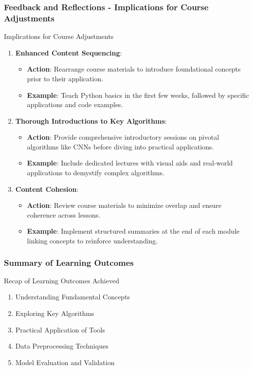 \documentclass[aspectratio=169]{beamer}
\begin{document}
\begin{frame}[fragile]
    \frametitle{Feedback and Reflections - Implications for Course Adjustments}
    \begin{block}{Implications for Course Adjustments}
        \begin{enumerate}
            \item \textbf{Enhanced Content Sequencing}:
            \begin{itemize}
                \item \textbf{Action}: Rearrange course materials to introduce foundational concepts prior to their application.
                \item \textbf{Example}: Teach Python basics in the first few weeks, followed by specific applications and code examples.
            \end{itemize}
            
            \item \textbf{Thorough Introductions to Key Algorithms}:
            \begin{itemize}
                \item \textbf{Action}: Provide comprehensive introductory sessions on pivotal algorithms like CNNs before diving into practical applications.
                \item \textbf{Example}: Include dedicated lectures with visual aids and real-world applications to demystify complex algorithms.
            \end{itemize}
            
            \item \textbf{Content Cohesion}:
            \begin{itemize}
                \item \textbf{Action}: Review course materials to minimize overlap and ensure coherence across lessons.
                \item \textbf{Example}: Implement structured summaries at the end of each module linking concepts to reinforce understanding.
            \end{itemize}
        \end{enumerate}
    \end{block}
\end{frame}

\begin{frame}
    \frametitle{Summary of Learning Outcomes}
    \begin{block}{Recap of Learning Outcomes Achieved}
        \begin{enumerate}
            \item Understanding Fundamental Concepts
            \item Exploring Key Algorithms
            \item Practical Application of Tools
            \item Data Preprocessing Techniques
            \item Model Evaluation and Validation
        \end{enumerate}
    \end{block}
\end{frame}
\end{document}

